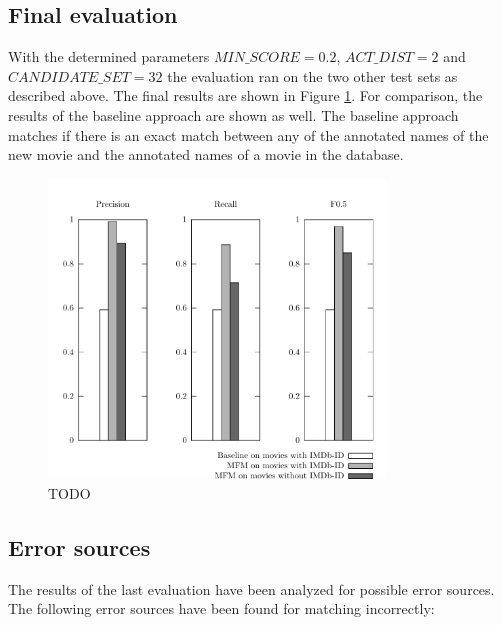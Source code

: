 \subsection{Final evaluation}
With the determined parameters $MIN\_SCORE = 0.2$, $ACT\_DIST = 2$ and $CANDIDATE\_SET = 32$ the evaluation ran on the two other test sets as described above.
The final results are shown in Figure \ref{fig_baseline}.
For comparison, the results of the baseline approach are shown as well.
The baseline approach matches if there is an exact match between any of the annotated names of the new movie and the annotated names of a movie in the database.

\begin{figure}[h!]
  \begin{center}
  \includegraphics[width=0.8\textwidth]{images/baseline.pdf}
  \end{center}
  \caption{TODO}
  \label{fig_baseline}
\end{figure}

\subsection{Error sources}
The results of the last evaluation have been analyzed for possible error sources.
The following error sources have been found for matching incorrectly:

